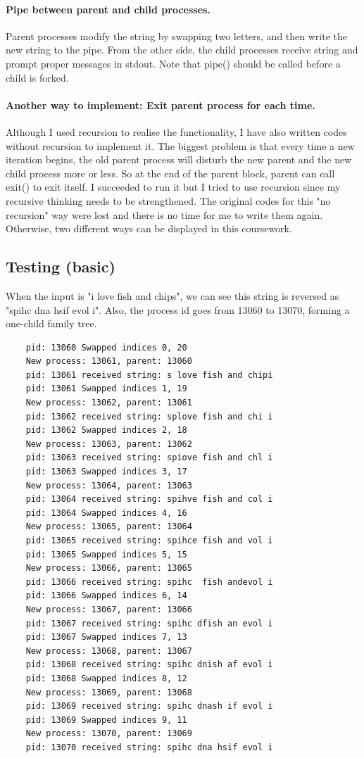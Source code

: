 \documentclass{article}
\begin{document}
\paragraph{Pipe between parent and child processes.}
Parent processes modify the string by swapping two letters, and then write the new string to the pipe. From the other side, the child processes receive string and prompt proper messages in stdout. Note that pipe() should be called before a child is forked.
\paragraph{Another way to implement: Exit parent process for each time.} Although I used recursion to realise the functionality, I have also written codes without recursion to implement it. The biggest problem is that every time a new iteration begins, the old parent process will disturb the new parent and the new child process more or less. So at the end of the parent block, parent can call exit() to exit itself. I succeeded to run it but I tried to use recursion since my recursive thinking needs to be strengthened. The original codes for this "no recursion" way were lost and there is no time for me to write them again. Otherwise, two different ways can be displayed in this coursework.
\subsection{Testing (basic)}
When the input is "i love fish and chips", we can see this string is reversed as "spihc dna hsif evol i". Also, the process id goes from 13060 to 13070, forming a one-child family tree.
\begin{lstlisting}
	pid: 13060 Swapped indices 0, 20 
	New process: 13061, parent: 13060 
	pid: 13061 received string: s love fish and chipi  
	pid: 13061 Swapped indices 1, 19 
	New process: 13062, parent: 13061 
	pid: 13062 received string: splove fish and chi i  
	pid: 13062 Swapped indices 2, 18 
	New process: 13063, parent: 13062 
	pid: 13063 received string: spiove fish and chl i  
	pid: 13063 Swapped indices 3, 17 
	New process: 13064, parent: 13063 
	pid: 13064 received string: spihve fish and col i  
	pid: 13064 Swapped indices 4, 16 
	New process: 13065, parent: 13064 
	pid: 13065 received string: spihce fish and vol i  
	pid: 13065 Swapped indices 5, 15 
	New process: 13066, parent: 13065 
	pid: 13066 received string: spihc  fish andevol i  
	pid: 13066 Swapped indices 6, 14 
	New process: 13067, parent: 13066 
	pid: 13067 received string: spihc dfish an evol i  
	pid: 13067 Swapped indices 7, 13 
	New process: 13068, parent: 13067 
	pid: 13068 received string: spihc dnish af evol i  
	pid: 13068 Swapped indices 8, 12 
	New process: 13069, parent: 13068 
	pid: 13069 received string: spihc dnash if evol i  
	pid: 13069 Swapped indices 9, 11 
	New process: 13070, parent: 13069 
	pid: 13070 received string: spihc dna hsif evol i 
\end{lstlisting}
\end{document}
